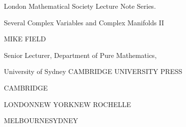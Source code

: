 \clearpage
\begingroup
    \thispagestyle{empty}
    \noindent London Mathematical Society Lecture Note Series.
    \vfill
    {\Huge\bfseries\raggedright Several Complex Variables and Complex Manifolds II\par}
    \vspace{2cm}
    {\Large MIKE FIELD\par}
    Senior Lecturer, Department of Pure Mathematics,\par
    University of Sydney
    \vfill
    CAMBRIDGE UNIVERSITY PRESS\par\medskip
    CAMBRIDGE\par\medskip
    LONDON\quad NEW YORK\quad NEW ROCHELLE\par\medskip
    MELBOURNE\quad SYDNEY
    \clearpage
\endgroup
